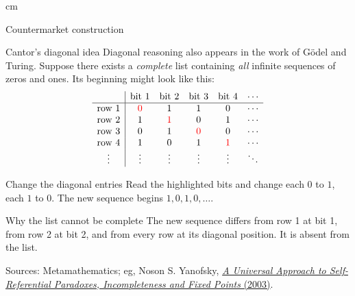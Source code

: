 \documentclass{beamer}
\newcommand{\doiref}[2]{%
  \href{https://doi.org/#1}{\textcolor{blue!65!black}{#2}}}
\newcommand{\sourcefoot}[1]{%
  \par\vfill{\fontsize{6.3}{7.5}\selectfont\color{black!65}Sources: #1\par}}
\begin{document}
\begin{frame}
 cm
\begin{center}
\Large\color{blue}
Countermarket construction
\end{center}
\end{frame}

\begin{frame}[shrink=8]{Cantor's diagonal idea}
\small
Diagonal reasoning also appears in the work of G\"odel and Turing.
Suppose there exists a \emph{complete} list containing \emph{all} infinite sequences of zeros and
ones. Its beginning might look like this:
\[
\begin{array}{c|ccccc}
 & \text{bit 1}&\text{bit 2}&\text{bit 3}&\text{bit 4}&\cdots\\\hline
\text{row 1}&\textcolor{red}{0}&1&1&0&\cdots\\
\text{row 2}&1&\textcolor{red}{1}&0&1&\cdots\\
\text{row 3}&0&1&\textcolor{red}{0}&0&\cdots\\
\text{row 4}&1&0&1&\textcolor{red}{1}&\cdots\\
\vdots&\vdots&\vdots&\vdots&\vdots&\ddots
\end{array}
\]
\begin{exampleblock}{Change the diagonal entries}
Read the highlighted bits and change each $0$ to $1$, each $1$ to $0$.
The new sequence begins $1,0,1,0,\ldots$.
\end{exampleblock}
\begin{alertblock}{Why the list cannot be complete}
The new sequence differs from row 1 at bit 1, from row 2 at bit 2,
and from every row at its diagonal position. It is absent from the list.
\end{alertblock}
\sourcefoot{Metamathematics; eg, Noson S. Yanofsky,
\doiref{10.2178/bsl/1058448677}{\emph{A Universal Approach to Self-Referential Paradoxes, Incompleteness and Fixed Points} (2003)}.}
\end{frame}
\end{document}
